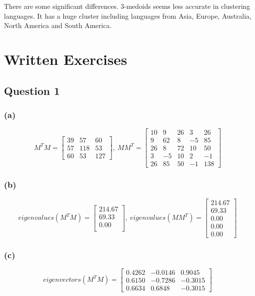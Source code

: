 \documentclass[12pt]{article}
\begin{document}
{There are some significant differences. 3-medoids seems less accurate in clustering languages. It has a huge cluster including languages from Asia, Europe, Australia, North America and South America.

\section*{Written Exercises}
\subsection*{Question 1}
\subsubsection*{(a)}
\[
M^TM
=
\begin{bmatrix}
39 & 57 & 60 \\
57 & 118 & 53 \\
60 & 53 & 127
\end{bmatrix},\ 
MM^T
=
\begin{bmatrix}
10 & 9 & 26 & 3 & 26 \\
9 & 62 & 8 & -5 & 85 \\
26 & 8 & 72 & 10 & 50 \\
3 & -5 & 10 & 2 & -1 \\
26 & 85 & 50 & -1 & 138
\end{bmatrix}
\]

\subsubsection*{(b)}
\[
eigenvalues(M^TM)
=
\begin{bmatrix}
214.67 \\
69.33 \\
0.00 \\

\end{bmatrix},\ 
eigenvalues(MM^T)
=
\begin{bmatrix}
214.67 \\
69.33 \\
0.00 \\
0.00 \\
0.00
\end{bmatrix}
\]

\subsubsection*{(c)}
\[
eigenvectors(M^TM)
=
\begin{bmatrix}
0.4262 & -0.0146 & 0.9045 \\
0.6150 & -0.7286 & -0.3015 \\
0.6634 & 0.6848 & -0.3015
\end{bmatrix}\]

}
\end{document}
